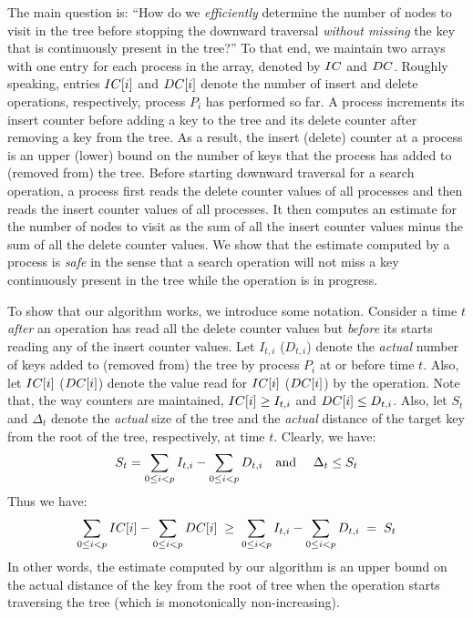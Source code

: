 \begin{limitscope}
The main question is: ``How do we \emph{efficiently} determine the number of nodes to visit in the tree before stopping the downward traversal \emph{without missing} the key that is continuously present in the tree?'' To that end, we maintain two arrays with one entry for each process in the array, denoted by $IC$ and $DC$. Roughly speaking, entries $IC[i]$ and $DC[i]$ denote the number of insert and delete operations, respectively, process $P_i$ has performed so far. A process increments its insert counter before adding a key to the tree and its delete counter after removing a key from the tree. As a result, the insert (delete) counter at a process is an upper (lower) bound on the number of keys that the process has added to (removed from) the tree. Before starting downward traversal for a search operation, a process first reads the delete counter values of all processes and then reads the insert counter values of all processes. It then computes an estimate for the number of nodes to visit as the sum of all the insert counter values minus the sum of all the delete counter values. We show that the estimate computed by a process is \emph{safe} in the sense that a search operation will not miss a key continuously present in the tree while the operation is in progress.

To show that our algorithm works, we introduce some notation. Consider a time $t$ \emph{after} an operation has read all the delete counter values but \emph{before} its starts reading any of the insert counter values. Let $I_{t,i}$ ($D_{t,i}$) denote the \emph{actual} number of keys added to (removed from) the tree by process $P_i$ at or before time $t$. Also, let $IC[i]$ ($DC[i]$) denote the value read for $IC[i]$ ($DC[i]$) by the operation. Note that, the way counters are maintained, $IC[i] \geq I_{t,i}$ and $DC[i] \leq D_{t,i}$. Also, let $S_t$ and $\Delta_t$ denote the \emph{actual} size of the tree and the \emph{actual} distance of the target key from the root of the tree, respectively, at time $t$. Clearly, we have:
\[
S_t = \sum_{0 \leq i < p} I_{t,i} - \sum_{0 \leq i < p} D_{t,i} \text{\quad and \quad} \Delta_t \leq S_t
\]
Thus we have:
\[
\sum_{0 \leq i < p} IC[i] - \sum_{0 \leq i < p} DC[i]  \; \geq \; \sum_{0 \leq i < p} I_{t,i} - \sum_{0 \leq i < p} D_{t,i} \; = \; S_t 
\]
In other words, the estimate computed by our algorithm is an upper bound on the actual distance of the key from the root of tree when the operation starts traversing the tree (which is monotonically non-increasing).


\end{limitscope}
